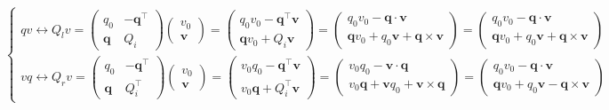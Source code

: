 \documentclass[
]{book}
\theoremstyle{definition}
\theoremstyle{definition}
\theoremstyle{definition}
\theoremstyle{definition}
\theoremstyle{remark}
\begin{document}
\[
\begin{cases}
qv\leftrightarrow Q_{{\scriptscriptstyle l}}v=\begin{pmatrix}q_{{\scriptscriptstyle 0}} & -\boldsymbol{q}^{\intercal}\\
\boldsymbol{q} & Q_{{\scriptscriptstyle i}}
\end{pmatrix}\begin{pmatrix}v_{{\scriptscriptstyle 0}}\\
\boldsymbol{v}
\end{pmatrix}=\begin{pmatrix}q_{{\scriptscriptstyle 0}}v_{{\scriptscriptstyle 0}}-\boldsymbol{q}^{\intercal}\boldsymbol{v}\\
\boldsymbol{q}v_{{\scriptscriptstyle 0}}+Q_{{\scriptscriptstyle i}}\boldsymbol{v}
\end{pmatrix}=\begin{pmatrix}q_{{\scriptscriptstyle 0}}v_{{\scriptscriptstyle 0}}-\boldsymbol{q}\cdot\boldsymbol{v}\\
\boldsymbol{q}v_{{\scriptscriptstyle 0}}+q_{{\scriptscriptstyle 0}}\boldsymbol{v}+\boldsymbol{q}\times\boldsymbol{v}
\end{pmatrix}=\begin{pmatrix}q_{{\scriptscriptstyle 0}}v_{{\scriptscriptstyle 0}}-\boldsymbol{q}\cdot\boldsymbol{v}\\
\boldsymbol{q}v_{{\scriptscriptstyle 0}}+q_{{\scriptscriptstyle 0}}\boldsymbol{v}+\boldsymbol{q}\times\boldsymbol{v}
\end{pmatrix}\\
vq\leftrightarrow Q_{{\scriptscriptstyle r}}v=\begin{pmatrix}q_{{\scriptscriptstyle 0}} & -\boldsymbol{q}^{\intercal}\\
\boldsymbol{q} & Q_{{\scriptscriptstyle i}}^{\intercal}
\end{pmatrix}\begin{pmatrix}v_{{\scriptscriptstyle 0}}\\
\boldsymbol{v}
\end{pmatrix}=\begin{pmatrix}v_{{\scriptscriptstyle 0}}q_{{\scriptscriptstyle 0}}-\boldsymbol{q}^{\intercal}\boldsymbol{v}\\
v_{{\scriptscriptstyle 0}}\boldsymbol{q}+Q_{{\scriptscriptstyle i}}^{\intercal}\boldsymbol{v}
\end{pmatrix}=\begin{pmatrix}v_{{\scriptscriptstyle 0}}q_{{\scriptscriptstyle 0}}-\boldsymbol{v}\cdot\boldsymbol{q}\\
v_{{\scriptscriptstyle 0}}\boldsymbol{q}+\boldsymbol{v}q_{{\scriptscriptstyle 0}}+\boldsymbol{v}\times\boldsymbol{q}
\end{pmatrix}=\begin{pmatrix}q_{{\scriptscriptstyle 0}}v_{{\scriptscriptstyle 0}}-\boldsymbol{q}\cdot\boldsymbol{v}\\
\boldsymbol{q}v_{{\scriptscriptstyle 0}}+q_{{\scriptscriptstyle 0}}\boldsymbol{v}-\boldsymbol{q}\times\boldsymbol{v}
\end{pmatrix}
\end{cases}
\]
\end{document}
